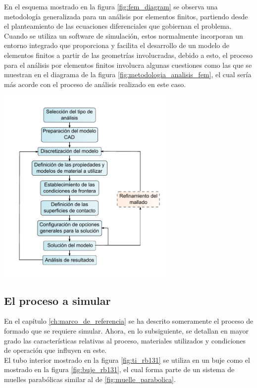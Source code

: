 En el esquema mostrado en la figura \ref{fig:fem_diagram} se observa una metodología generalizada 
para un análisis por elementos finitos, partiendo desde el planteamiento de las 
ecuaciones diferenciales que gobiernan el problema. Cuando se utiliza un software 
de simulación, estos normalmente incorporan un entorno integrado que 
proporciona y facilita el desarrollo de un modelo de elementos finitos a partir 
de las geometrías involucradas, debido a esto, el proceso para el análisis por elementos 
finitos involucra algunas cuestiones como las que se muestran en el diagrama de 
la figura \ref{fig:metodologia_analisis_fem}, el cual sería más acorde con 
el proceso de análisis realizado en este caso.

\begin{center}
\includegraphics[width=0.65\textwidth]{src/ch3/metodologia_analisis_fem.pdf}
\label{fig:metodologia_analisis_fem}
\end{center}

\subsection{El proceso a simular}

En el capítulo \ref{ch:marco_de_referencia} se ha descrito someramente el proceso de formado que se requiere 
simular. Ahora, en lo subsiguiente, se detallan en mayor grado las características 
relativas al proceso, materiales utilizados y condiciones de operación que influyen en este. \\

El tubo interior mostrado en la figura \ref{fig:ti_rb131} se utiliza en un buje como 
el mostrado en la figura \ref{fig:buje_rb131}, el cual forma parte de un sistema de muelles 
parabólicas similar al de \ref{fig:muelle_parabolica}.

